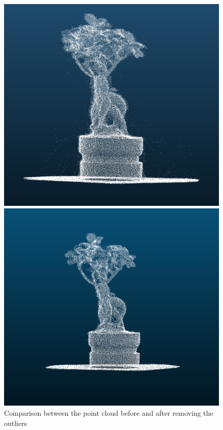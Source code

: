 \documentclass[runningheads,a4paper]{llncs}
\begin{document}
\begin{figure}
\begin{minipage}{.5\textwidth}
  \includegraphics[width=0.9\linewidth]{complex-tree-sample.png}
\end{minipage}
\begin{minipage}{.5\textwidth}
  \centering
  \includegraphics[width=0.9\linewidth]{after-filter.PNG}
\end{minipage}
\caption{Comparison between the point cloud before and after removing the outliers}
\label{fig:fiiter-comparison}
\end{figure}
\newpage
\end{document}
